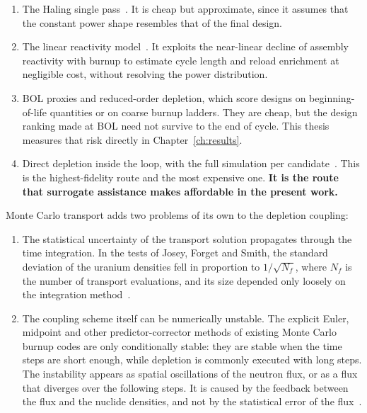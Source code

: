 \begin{enumerate}
  \item The Haling single pass~\cite{downar_1988}. It is cheap but
        approximate, since it assumes that the constant power shape
        resembles that of the final design.

  \item The linear reactivity model~\cite{lee_2020}. It exploits the
        near-linear decline of assembly reactivity with burnup to
        estimate cycle length and reload enrichment at negligible cost,
        without resolving the power distribution.

  \item BOL proxies and reduced-order depletion, which score designs on
        beginning-of-life quantities or on coarse burnup ladders. They
        are cheap, but the design ranking made at BOL need not survive to
        the end of cycle. This thesis measures that risk directly in
        Chapter~\ref{ch:results}.

  \item Direct depletion inside the loop, with the full simulation per
        candidate~\cite{romano_2021_depletion}. This is the
        highest-fidelity route and the most expensive one. \textbf{It is
        the route that surrogate assistance makes affordable in the
        present work.}
\end{enumerate}

Monte Carlo transport adds two problems of its own to the depletion
coupling:

\begin{enumerate}
  \item The statistical uncertainty of the transport solution propagates
        through the time integration. In the tests of Josey, Forget and
        Smith, the standard deviation of the uranium densities fell in
        proportion to $1/\sqrt{N_f}$, where $N_f$ is the number of
        transport evaluations, and its size depended only loosely on the
        integration method~\cite{josey_2017}.

  \item The coupling scheme itself can be numerically unstable. The
        explicit Euler, midpoint and other predictor-corrector methods of
        existing Monte Carlo burnup codes are only conditionally stable:
        they are stable when the time steps are short enough, while
        depletion is commonly executed with long steps. The instability
        appears as spatial oscillations of the neutron flux, or as a flux
        that diverges over the following steps. It is caused by the
        feedback between the flux and the nuclide densities, and not by
        the statistical error of the flux~\cite{dufek_2013_sie}.
\end{enumerate}

